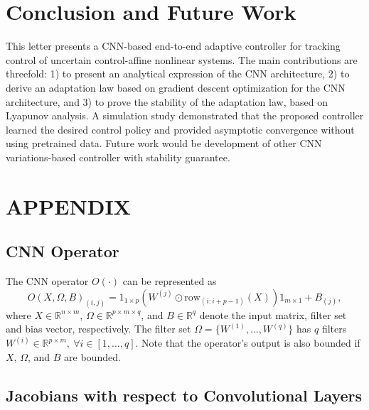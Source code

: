 \documentclass[letterpaper, 10 pt, conference]{ieeeconf}  %
\begin{document}
\section{Conclusion and Future Work}
This letter presents a CNN-based end-to-end adaptive controller for tracking control of uncertain control-affine nonlinear systems. The main contributions are threefold: 1) to present an analytical expression of the CNN architecture, 2) to derive an adaptation law based on gradient descent optimization for the CNN architecture, and 3) to prove the stability of the adaptation law, based on Lyapunov analysis. A simulation study demonstrated that the proposed controller learned the desired control policy and provided asymptotic convergence without using pretrained data. 
Future work would be development of other CNN variations-based controller with stability guarantee.


\section*{APPENDIX}

\subsection{CNN Operator}\label{A. CNN Operator}

The CNN operator $O(\cdot)$ can be represented as 
\begin{equation}
    O(X,\Omega,B)_{(i,j)} = 
    1_{1\times p}
    (
    W^{(j)}\odot \text{row}_{(i:i+p-1)} (X)
    )
    1_{m\times 1}
    + B_{(j)},
\end{equation}
where $X\in\mathbb{R}^{n\times m}$, $\Omega \in\mathbb{R}^{p\times m\times q}$, and $B\in\mathbb{R}^{q}$ denote the input matrix, filter set and bias vector, respectively.
The filter set $\Omega=\{W^{(1)},\dots,W^{(q)}\}$ has $q$ filters $W^{(i)}\in\mathbb{R}^{p\times m},\ \forall i\in[1,\dots, q]$. 
Note that the operator's output is also bounded if $X$, $\Omega$, and $B$ are bounded.

\subsection{Jacobians with respect to Convolutional Layers}\label{A. CNN Jacobian}
\end{document}
